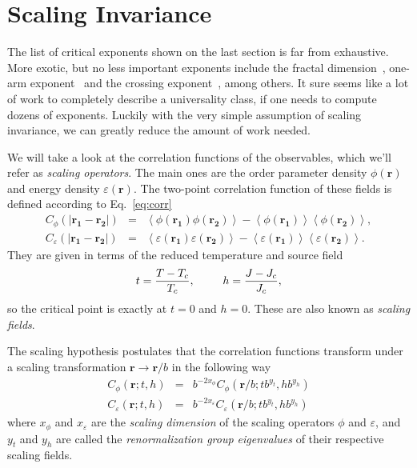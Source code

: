 \section{Scaling Invariance}
\label{sec:scaling}
\renewcommand{\op}{\phi}

The list of critical exponents shown on the last section is far from
exhaustive. More exotic, but no less important exponents include the fractal
dimension~\cite{Voss1984}, one-arm exponent~\cite{Lawler2001} and the crossing
exponent~\cite{Aizenman1999}, among others. It sure seems like a lot of work to
completely describe a universality class, if one needs to compute dozens of
exponents. Luckily with the very simple assumption of scaling invariance, we
can greatly reduce the amount of work needed.

We will take a look at the correlation functions of the observables, which
we'll refer as \textit{scaling operators}. The main ones are the order
parameter density $\op(\mathbf{r})$ and energy density
$\varepsilon(\mathbf{r})$. The two-point correlation function of these fields is
defined according to Eq.~\ref{eq:corr}
\begin{eqnarray}
    \label{eq:corr10}
    C_{\op}\left(\left|\mathbf{r_1}-\mathbf{r_2}\right|\right) & = &
    \left\langle
        \op\left(\mathbf{r_{1}}\right)
        \op\left(\mathbf{r_{2}}\right)
    \right\rangle -
    \left\langle
        \op\left(\mathbf{r_{1}}\right)
    \right\rangle
    \left\langle
        \op\left(\mathbf{r_{2}}\right)
    \right\rangle,
    \\
    \label{eq:corr11}
    C_{\varepsilon}\left(\left|\mathbf{r_1}-\mathbf{r_2}\right|\right) & = &
    \left\langle
        \varepsilon\left(\mathbf{r_{1}}\right)
        \varepsilon\left(\mathbf{r_{2}}\right)
    \right\rangle-
    \left\langle
        \varepsilon\left(\mathbf{r_{1}}\right)
    \right\rangle
    \left\langle
        \varepsilon\left(\mathbf{r_{2}}\right)
    \right\rangle.
\end{eqnarray}
They are given in terms of the reduced temperature and source field
\begin{equation}
    t=\frac{T-T_c}{T_c},\;\;\;\;\;\;\;\;\;h=\frac{J-J_c}{J_c},
\end{equation}
so the critical point is exactly at $t=0$ and $h=0$. These are also known
as \textit{scaling fields}.

The scaling hypothesis postulates that the correlation functions transform
under a scaling transformation $\mathbf{r}\rightarrow\mathbf{r}/b$ in the
following way
\begin{eqnarray}
    \label{eq:scal}
    C_{\op}\left(\mathbf{r};t,h\right) & = &
    b^{-2x_{\op}}C_{\op}\left(\mathbf{r}/b;tb^{y_{t}},hb^{y_{h}}\right)\\
    \label{eq:scal10}
    C_{\varepsilon}\left(\mathbf{r};t,h\right) & = &
    b^{-2x_{\varepsilon}}C_{\varepsilon}\left(\mathbf{r}/b;tb^{y_{t}},hb^{y_{h}}\right)
\end{eqnarray}
where $x_\op$ and $x_\varepsilon$ are the \textit{scaling dimension} of the
scaling operators $\op$ and $\varepsilon$, and $y_t$ and $y_h$ are called the
\textit{renormalization group eigenvalues} of their respective scaling fields.

